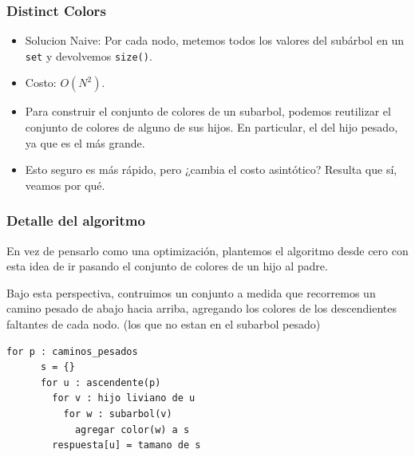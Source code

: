 \begin{frame}
  \frametitle{Distinct Colors}

  \begin{itemize}
    \item Solucion Naive: Por cada nodo, metemos todos los valores del subárbol en un \texttt{set} y devolvemos \texttt{size()}.
    \item Costo: \(O(N^2)\).
    \item Para construir el conjunto de colores de un subarbol, podemos reutilizar el conjunto de colores de alguno de sus hijos. En particular, el del hijo pesado, ya que es el más grande.
    \item Esto seguro es más rápido, pero ¿cambia el costo asintótico? Resulta que sí, veamos por qué.
  \end{itemize}

\end{frame}

\begin{frame}[fragile]
\frametitle{Detalle del algoritmo}

En vez de pensarlo como una optimización, plantemos el algoritmo desde cero con esta idea de ir pasando el conjunto de colores de un hijo al padre.

Bajo esta perspectiva, contruimos un conjunto a medida que recorremos un camino pesado de abajo hacia arriba, agregando los colores de los descendientes faltantes de cada nodo. (los que no estan en el subarbol pesado)

\begin{lstlisting}[language={},basicstyle=\ttfamily\small]
    for p : caminos_pesados
      s = {}
      for u : ascendente(p)
        for v : hijo liviano de u
          for w : subarbol(v)
            agregar color(w) a s
        respuesta[u] = tamano de s
\end{lstlisting}

\end{frame}


